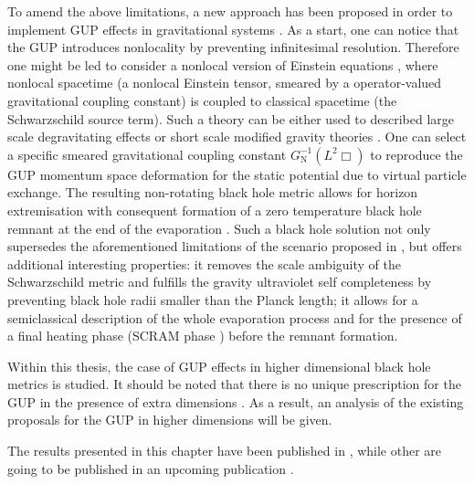 \begin{fullwidth}
To amend the above limitations, a new approach has been proposed in order to 
implement GUP effects in gravitational systems \cite{IMN13}. As a start, one 
can notice that the GUP introduces nonlocality by preventing infinitesimal 
resolution.  Therefore one might be led to consider a nonlocal version of 
Einstein equations \cite{Kra87,Tom97,Bar03,Mod12a}, where nonlocal
spacetime (\ie a nonlocal Einstein tensor, smeared by a 
operator-valued gravitational coupling constant)
is coupled to classical spacetime (\ie the Schwarzschild source term).
Such a theory 
can be either used to described large scale degravitating effects 
\cite{ADD02,DHK07,Bar05,Bar12} or short scale modified gravity theories 
\cite{GHS10,MMN11,Nic12,CMN14,FKN16}. 
One can select a specific smeared gravitational coupling constant 
$G_\mathrm{N}^{-1}\left(L^2\Box\right)$ to reproduce the GUP 
momentum space deformation
for the static potential due to virtual particle exchange.
The resulting non-rotating black hole metric allows for 
horizon extremisation with consequent formation of a zero temperature black 
hole remnant at the end of the evaporation \cite{IMN13}. Such a black hole 
solution not only supersedes the aforementioned limitations of the scenario 
proposed in \cite{AdS99,APS01}, but offers additional interesting properties: 
it removes the scale ambiguity of the Schwarzschild metric and fulfills the 
gravity ultraviolet self completeness by preventing black hole radii smaller 
than the Planck length; it allows for a semiclassical description of the whole 
evaporation process and for the presence of a final heating phase (SCRAM 
phase \cite{Nic09}) before the remnant formation.

Within this thesis, the case of GUP effects in higher dimensional black hole
metrics is studied. It should be noted that there is no
unique prescription for the GUP in the presence of extra
dimensions \cite{Koppel:2017rsf}. As a result, an analysis of the existing
proposals
\cite{ScC03,Maz13,Car13,Car14,LaC15,LaC16,Carr:2017grh,Maz12,DMS15,Maz15,LaC18}
for the GUP in higher dimensions will be given.

The results presented in this chapter have been published in
\cite{Koppel:2017rsf}, while other are going to be published in an upcoming
publication \cite{Knipfer2019}.


\end{fullwidth}

